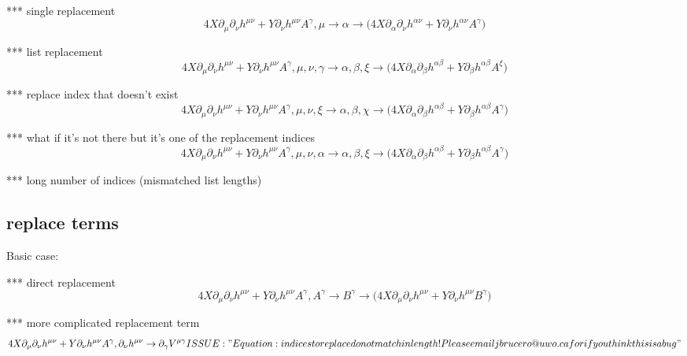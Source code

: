 \documentclass{article}
\def\){\Big)}
\def\({\Big(}
\begin{document}
*** single replacement
\begin{equation}
4X \partial_{\mu} \partial_{\nu}h^{\mu \nu} +Y \partial_{\nu}h^{\mu \nu} A^{\gamma} , \mu \rightarrow \alpha \rightarrow 
\(4 X \partial_{\alpha}\partial_{\nu}h^{\alpha \nu} +Y \partial_{\nu}h^{\alpha \nu} A^{\gamma} \)
\end{equation}

*** list replacement
\begin{equation}
4X \partial_{\mu} \partial_{\nu}h^{\mu \nu} +Y \partial_{\nu}h^{\mu \nu} A^{\gamma} , \mu, \nu, \gamma \rightarrow \alpha, \beta, \xi \rightarrow 
 \(4 X \partial_{\alpha}\partial_{\beta}h^{\alpha \beta} +Y \partial_{\beta}h^{\alpha \beta} A^{\xi} \)
\end{equation}

*** replace index that doesn’t exist
\begin{equation}
4X \partial_{\mu} \partial_{\nu}h^{\mu \nu} +Y \partial_{\nu}h^{\mu \nu} A^{\gamma} , \mu, \nu, \xi \rightarrow \alpha, \beta, \chi \rightarrow 
\(4 X \partial_{\alpha}\partial_{\beta}h^{\alpha \beta} +Y \partial_{\beta}h^{\alpha \beta} A^{\gamma} \)
\end{equation}

*** what if it’s not there but it’s one of the replacement indices
\begin{equation}
4X \partial_{\mu} \partial_{\nu}h^{\mu \nu} +Y \partial_{\nu}h^{\mu \nu} A^{\gamma} , \mu, \nu, \alpha \rightarrow \alpha, \beta, \xi \rightarrow 
\(4 X \partial_{\alpha}\partial_{\beta}h^{\alpha \beta} +Y \partial_{\beta}h^{\alpha \beta} A^{\gamma} \)
\end{equation}

*** long number of indices (mismatched list lengths) 




\subsection{replace terms}

Basic case:

*** direct replacement
\begin{equation}
4X \partial_{\mu} \partial_{\nu}h^{\mu \nu} +Y \partial_{\nu}h^{\mu \nu} A^{\gamma} , A^{\gamma} \rightarrow B^{\gamma} \rightarrow  
\(4 X \partial_{\mu}\partial_{\nu}h^{\mu \nu} +Y \partial_{\nu}h^{\mu \nu} B^{\gamma} \)
\end{equation}

{\color{red}
*** more complicated replacement term
\begin{equation}
4X \partial_{\mu} \partial_{\nu}h^{\mu \nu} +Y \partial_{\nu}h^{\mu \nu} A^{\gamma} ,  \partial_{\nu}h^{\mu \nu} \rightarrow \partial_{\gamma} V^{\mu \gamma}  ISSUE:" Equation: indices to replace do not match in length!
Please email jbrucero@uwo.ca for if you think this is a bug"
\end{equation}
}
\end{document}
